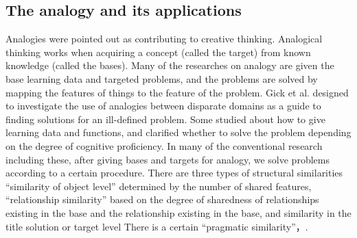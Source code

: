 \documentclass[journal]{IAENGtran}
\begin{document}
\subsection{The analogy and its applications}
\label{subsec:The analogy and its applications}

Analogies were pointed out as contributing to creative thinking\cite{Codd04}.
Analogical thinking works when acquiring a concept (called the target) from known knowledge (called the bases)\cite{Codd05}.
Many of the researches on analogy are given the base learning data and targeted problems, and the problems are solved by mapping the features of things to the feature of the problem\cite{Codd06}.
Gick et al. designed to investigate the use of analogies between disparate domains as a guide to finding solutions for an ill-defined problem.
Some studied about how to give learning data and functions\cite{Codd07}, and clarified whether to solve the problem depending on the degree of cognitive proficiency\cite{Codd08}.
In many of the conventional research including these, after giving bases and targets for analogy, we solve problems according to a certain procedure.
There are three types of structural similarities ``similarity of object level'' determined by the number of shared features, ``relationship similarity'' based on the degree of sharedness of relationships existing in the base and the relationship existing in the base, and similarity in the title solution or target level There is a certain ``pragmatic similarity''\cite{Codd05}，\cite{Codd09}.
\end{document}
